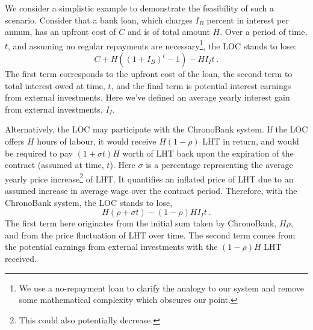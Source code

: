 \begin{multicols}{2}
We consider a simplistic example to demonstrate the feasibility of such a scenario. Consider that a bank loan, which charges $I_B$ percent in interest per annum, has an upfront cost of $C$ and is of total amount $H$. Over a period of time, $t$, and assuming no regular repayments are necessary\footnote{We use a no-repayment loan to clarify the analogy to our system and remove some mathematical complexity which obscures our point.}, the LOC stands to lose: 
\begin{equation}
  C + H ( (1 + I_B)^t -1) - H I_I t ~.
\end{equation}
The first term corresponds to the upfront cost of the loan, the second term to total interest owed at time, $t$, and the final term is potential interest earnings from external investments. Here we've defined an average yearly interest gain from external investments, $I_I$. 

Alternatively, the LOC may participate with the ChronoBank system. If the LOC offers $H$ hours of labour, it would receive $H(1-\rho)$ LHT in return, and would be required to pay $(1 + \sigma t)H$ worth of LHT back upon the expiration of the contract (assumed at time, $t$). Here $\sigma$ is a percentage representing the average yearly price increase\footnote{This could also potentially decrease.} of LHT. It quantifies an inflated price of LHT due to an assumed increase in average wage over the contract period. Therefore, with the ChronoBank system, the LOC stands to lose, 
\begin{equation}
  H(\rho + \sigma t) - (1-\rho) H I_I t ~. 
\end{equation}
The first term here originates from the initial sum taken by ChronoBank, $H\rho$, and from the price fluctuation of LHT over time. The second term comes from the potential earnings from external investments with the $(1 -\rho)H$ LHT received. 


\end{multicols}
